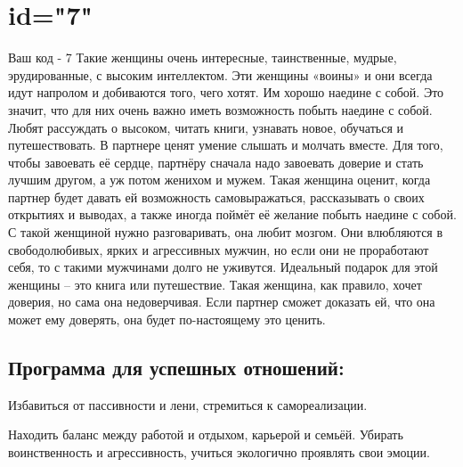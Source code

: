 \section{id="7"}{Ваш код - 7}
Такие женщины очень интересные, таинственные, мудрые, эрудированные, 
с высоким интеллектом. Эти женщины «воины» и они всегда идут напролом 
и добиваются того, чего хотят. Им хорошо наедине с собой. Это значит, 
что для них очень важно иметь возможность побыть наедине с собой. 
Любят рассуждать о высоком, читать книги, узнавать новое, обучаться 
и путешествовать. В партнере ценят умение слышать и молчать вместе. 
Для того, чтобы завоевать её сердце, партнёру сначала надо завоевать 
доверие и стать лучшим другом, а уж потом женихом и мужем. Такая 
женщина оценит, когда партнер будет давать ей возможность 
самовыражаться, рассказывать о своих открытиях и выводах, а также 
иногда поймёт её желание побыть наедине с собой. С такой женщиной 
нужно разговаривать, она любит мозгом. Они влюбляются в свободолюбивых, 
ярких и агрессивных мужчин, но если они не проработают себя, то с 
такими мужчинами долго не уживутся. Идеальный подарок для этой 
женщины – это книга или путешествие. Такая женщина, как правило, 
хочет доверия, но сама она недоверчивая. Если партнер сможет 
доказать ей, что она может ему доверять, она будет по-настоящему 
это ценить.
\subsection{Программа для успешных отношений:}
\item Избавиться от пассивности и лени, стремиться к самореализации.
\item Находить баланс между работой и отдыхом, карьерой и семьёй. 
Убирать воинственность и агрессивность, учиться экологично проявлять 
свои эмоции.
\endsubsection
\endsection

